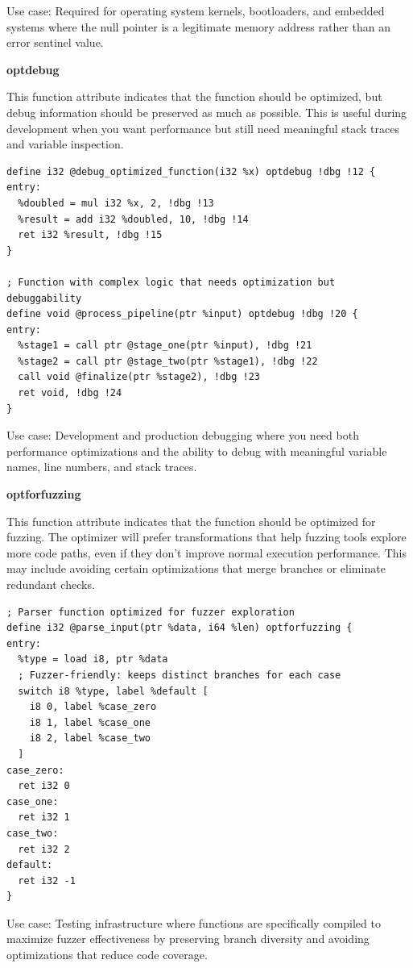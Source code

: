 Use case: Required for operating system kernels, bootloaders, and embedded systems where the null pointer is a legitimate memory address rather than an error sentinel value.

\textbf{optdebug}

This function attribute indicates that the function should be optimized, but debug information should be preserved as much as possible. This is useful during development when you want performance but still need meaningful stack traces and variable inspection.

\begin{lstlisting}[style=ir]
define i32 @debug_optimized_function(i32 %x) optdebug !dbg !12 {
entry:
  %doubled = mul i32 %x, 2, !dbg !13
  %result = add i32 %doubled, 10, !dbg !14
  ret i32 %result, !dbg !15
}

; Function with complex logic that needs optimization but debuggability
define void @process_pipeline(ptr %input) optdebug !dbg !20 {
entry:
  %stage1 = call ptr @stage_one(ptr %input), !dbg !21
  %stage2 = call ptr @stage_two(ptr %stage1), !dbg !22
  call void @finalize(ptr %stage2), !dbg !23
  ret void, !dbg !24
}
\end{lstlisting}

Use case: Development and production debugging where you need both performance optimizations and the ability to debug with meaningful variable names, line numbers, and stack traces.

\textbf{optforfuzzing}

This function attribute indicates that the function should be optimized for fuzzing.
The optimizer will prefer transformations that help fuzzing tools explore more code paths, even if they don't improve normal execution performance.
This may include avoiding certain optimizations that merge branches or eliminate redundant checks.

\begin{lstlisting}[style=ir]
; Parser function optimized for fuzzer exploration
define i32 @parse_input(ptr %data, i64 %len) optforfuzzing {
entry:
  %type = load i8, ptr %data
  ; Fuzzer-friendly: keeps distinct branches for each case
  switch i8 %type, label %default [
    i8 0, label %case_zero
    i8 1, label %case_one
    i8 2, label %case_two
  ]
case_zero:
  ret i32 0
case_one:
  ret i32 1
case_two:
  ret i32 2
default:
  ret i32 -1
}
\end{lstlisting}

Use case: Testing infrastructure where functions are specifically compiled to maximize fuzzer effectiveness by preserving branch diversity and avoiding optimizations that reduce code coverage.

